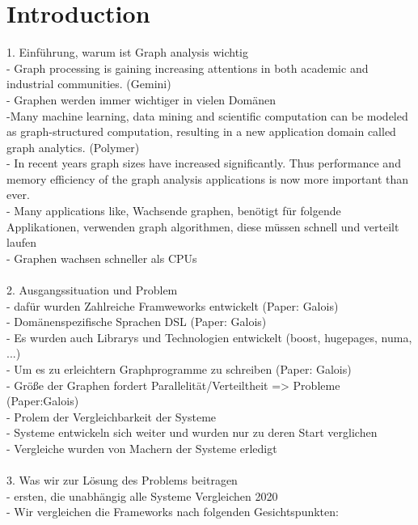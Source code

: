 \section{Introduction}

1. Einführung, warum ist Graph analysis wichtig\\
- Graph processing is gaining increasing attentions in both academic and industrial communities. (Gemini)\\
- Graphen werden immer wichtiger in vielen Domänen \\
-Many machine learning, data mining and scientific computation can be modeled as graph-structured computation, resulting in a new application domain called graph analytics. (Polymer)\\
- In recent years graph sizes have increased significantly. Thus performance and memory efficiency of the graph analysis applications is now more important than ever. \\
- Many applications like, Wachsende graphen, benötigt für folgende Applikationen, verwenden graph algorithmen, diese müssen schnell und verteilt laufen\\
- Graphen wachsen schneller als CPUs \\
\\
2. Ausgangssituation und Problem\\
- dafür wurden Zahlreiche Framweworks entwickelt (Paper: Galois)\\
- Domänenspezifische Sprachen DSL (Paper: Galois)\\
- Es wurden auch Librarys und Technologien entwickelt (boost, hugepages, numa, ...)\\
- Um es zu erleichtern Graphprogramme zu schreiben (Paper: Galois)\\
- Größe der Graphen fordert Parallelität/Verteiltheit => Probleme  (Paper:Galois)\\
- Prolem der Vergleichbarkeit der Systeme\\
- Systeme entwickeln sich weiter und wurden nur zu deren Start verglichen\\
- Vergleiche wurden von Machern der Systeme erledigt\\
\\
3. Was wir zur Lösung des Problems beitragen\\
- ersten, die unabhängig alle Systeme Vergleichen 2020\\
- Wir vergleichen die Frameworks nach folgenden Gesichtspunkten:\\
